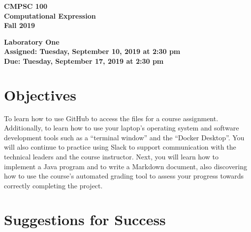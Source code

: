 \documentclass[11pt]{article}
\newcommand{\assignmentduedate}{September 17}
\newcommand{\assignmentassignedate}{September 10}
\newcommand{\assignmentnumber}{One}
\newcommand{\labyear}{2019}
\newcommand{\labday}{Tuesday}
\newcommand{\labtime}{2:30 pm}
\newcommand{\assigneddate}{Assigned: \labday, \assignmentassignedate, \labyear{} at \labtime{}}
\newcommand{\duedate}{Due: \labday, \assignmentduedate, \labyear{} at \labtime{}}
\newcommand{\labtitle}[1]
{
  \begin{center}
    \begin{center}
      \bf
      CMPSC 100\\Computational Expression\\
      Fall 2019\\
      \medskip
    \end{center}
    \bf
    #1
  \end{center}
}
\begin{document}
\thispagestyle{empty}

\labtitle{Laboratory \assignmentnumber{} \\ \assigneddate{} \\ \duedate{}}

\section*{Objectives}

To learn how to use GitHub to access the files for a course assignment.
Additionally, to learn how to use your laptop's operating system and software
development tools such as a ``terminal window'' and the ``Docker Desktop''. You
will also continue to practice using Slack to support communication with the
technical leaders and the course instructor. Next, you will learn how to
implement a Java program and to write a Markdown document, also discovering how
to use the course's automated grading tool to assess your progress towards
correctly completing the project.

\section*{Suggestions for Success}
\end{document}
